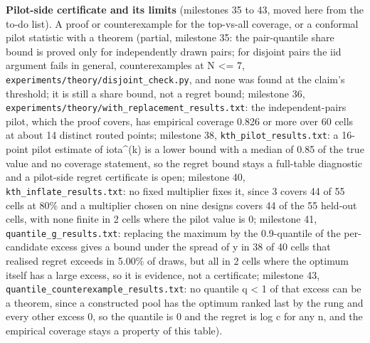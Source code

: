 \documentclass[conference]{IEEEtran}
\begin{document}
\textbf{Pilot-side certificate and its limits} (milestones 35 to 43,
moved here from the to-do list). A proof or counterexample for the
top-vs-all coverage, or a conformal pilot statistic with a theorem
(partial, milestone 35: the pair-quantile share bound is proved only for
independently drawn pairs; for disjoint pairs the iid argument fails in
general, counterexamples at N \textless= 7,
\texttt{experiments/\allowbreak{}theory/\allowbreak{}disjoint\_\allowbreak{}check.py}, and none was found at
the claim's threshold; it is still a share bound, not a regret bound;
milestone 36,
\texttt{experiments/\allowbreak{}theory/\allowbreak{}with\_\allowbreak{}replacement\_\allowbreak{}results.txt}: the
independent-pairs pilot, which the proof covers, has empirical coverage
0.826 or more over 60 cells at about 14 distinct routed points;
milestone 38, \texttt{kth\_\allowbreak{}pilot\_\allowbreak{}results.txt}: a 16-point pilot
estimate of iota\^{}(k) is a lower bound with a median of 0.85 of the
true value and no coverage statement, so the regret bound stays a
full-table diagnostic and a pilot-side regret certificate is open;
milestone 40, \texttt{kth\_\allowbreak{}inflate\_\allowbreak{}results.txt}: no fixed multiplier
fixes it, since 3 covers 44 of 55 cells at 80\% and a multiplier chosen
on nine designs covers 44 of the 55 held-out cells, with none finite in
2 cells where the pilot value is 0; milestone 41,
\texttt{quantile\_\allowbreak{}g\_\allowbreak{}results.txt}: replacing the maximum by the
0.9-quantile of the per-candidate excess gives a bound under the spread
of y in 38 of 40 cells that realised regret exceeds in 5.00\% of draws,
but all in 2 cells where the optimum itself has a large excess, so it is
evidence, not a certificate; milestone 43,
\texttt{quantile\_\allowbreak{}counterexample\_\allowbreak{}results.txt}: no quantile q
\textless{} 1 of that excess can be a theorem, since a constructed pool
has the optimum ranked last by the rung and every other excess 0, so the
quantile is 0 and the regret is log c for any n, and the empirical
coverage stays a property of this table).
\end{document}
